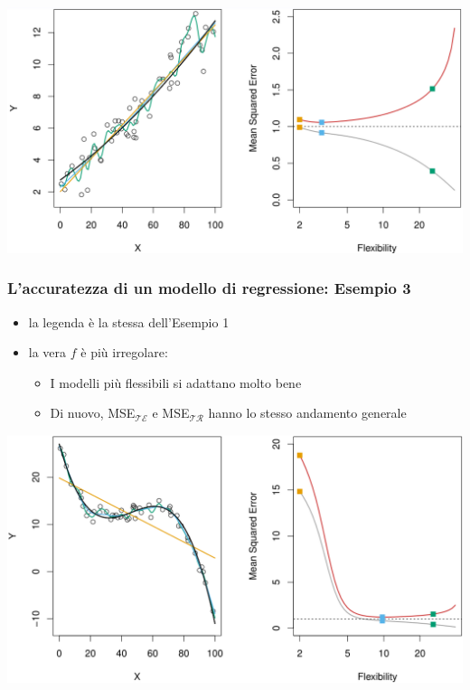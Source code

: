 {\begin{frame}
	\begin{center}
		\includegraphics[scale=0.4]{images/supervised/knn_regression/g9.png}
	\end{center}

\end{frame}

\begin{frame}

	\frametitle{L'accuratezza di un modello di regressione: Esempio 3}

	\begin{itemize}
		\item la legenda è la stessa dell'Esempio 1
		\item la vera $f$ è più irregolare:
			\begin{itemize}
				\item I modelli più flessibili si adattano molto bene
				\item Di nuovo, MSE$_{\mathcal{TE}}$ e MSE$_{\mathcal{TR}}$ hanno lo stesso andamento generale
			\end{itemize}
	\end{itemize}

	\begin{center}
		\includegraphics[scale=0.4]{images/supervised/knn_regression/g10.png}
	\end{center}

\end{frame}

}

